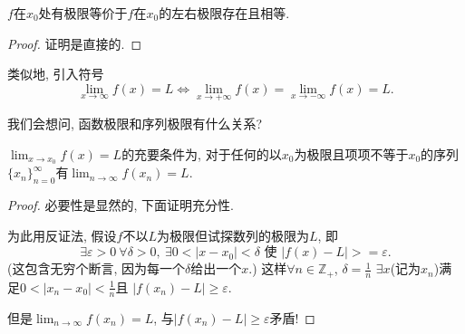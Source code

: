 \begin{proposition}
    $f$在$x_0$处有极限等价于$f$在$x_0$的左右极限存在且相等.
\end{proposition}
\begin{proof}
    证明是直接的.
\end{proof}
类似地, 引入符号
\begin{equation}
  \lim_{x \to \infty} f(x) = L \iff \lim_{x \to +\infty} f(x) = \lim_{x \to -\infty} f(x) = L.
\end{equation}

我们会想问, 函数极限和序列极限有什么关系?
\begin{theorem}[Heine]
    $\displaystyle \lim_{x \to x_0}f(x) = L$的充要条件为, 对于任何的以$x_0$为极限且项项不等于$x_0$的序列$\{ x_n \}_{n=0}^{\infty}$有$\displaystyle \lim_{n \to \infty}f(x_n) = L$.
\end{theorem}
\begin{proof}
    必要性是显然的, 下面证明充分性.

    为此用反证法, 假设$f$不以$L$为极限但试探数列的极限为$L$, 即
    \begin{equation}
      \exists \varepsilon > 0 \ \forall \delta > 0, \ \exists 0< |x-x_0| < \delta \text{ 使 } |f(x) - L| > =\varepsilon . 
    \end{equation}
    (这包含无穷个断言, 因为每一个$\delta$给出一个$x$.)
    这样$\forall n \in \mathbb{Z}_{+}$, $\delta = \frac{1}{n}$ $\exists x$(记为$x_n$)满足$0 < |x_n - x_0| < \frac{1}{n}$且
    $|f(x_n) - L| \ge \varepsilon$.

    但是$\lim_{n \to \infty} f(x_n) = L$, 与$\left| f\left( x_n \right) -L \right| \ge \varepsilon$矛盾!
\end{proof}
